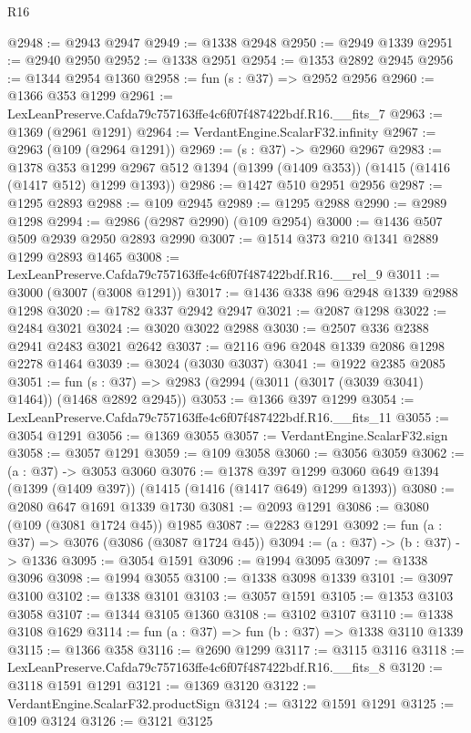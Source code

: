 \begin{lexlean}{R16}
\begin{coremodule}
@2948 := @2943 @2947
@2949 := @1338 @2948
@2950 := @2949 @1339
@2951 := @2940 @2950
@2952 := @1338 @2951
@2954 := @1353 @2892 @2945
@2956 := @1344 @2954 @1360
@2958 := fun (s : @37) => @2952 @2956
@2960 := @1366 @353 @1299
@2961 := LexLeanPreserve.Cafda79c757163ffe4c6f07f487422bdf.R16.__fits_7
@2963 := @1369 (@2961 @1291)
@2964 := VerdantEngine.ScalarF32.infinity
@2967 := @2963 (@109 (@2964 @1291))
@2969 := (s : @37) -> @2960 @2967
@2983 := @1378
    @353
    @1299
    @2967
    @512
    @1394
    (@1399 (@1409 @353))
    (@1415 (@1416 (@1417 @512) @1299 @1393))
@2986 := @1427 @510 @2951 @2956
@2987 := @1295 @2893
@2988 := @109 @2945
@2989 := @1295 @2988
@2990 := @2989 @1298
@2994 := @2986 (@2987 @2990) (@109 @2954)
@3000 := @1436 @507 @509 @2939 @2950 @2893 @2990
@3007 := @1514 @373 @210 @1341 @2889 @1299 @2893 @1465
@3008 := LexLeanPreserve.Cafda79c757163ffe4c6f07f487422bdf.R16.__rel_9
@3011 := @3000 (@3007 (@3008 @1291))
@3017 := @1436 @338 @96 @2948 @1339 @2988 @1298
@3020 := @1782 @337 @2942 @2947
@3021 := @2087 @1298
@3022 := @2484 @3021
@3024 := @3020 @3022 @2988
@3030 := @2507 @336 @2388 @2941 @2483 @3021 @2642
@3037 := @2116 @96 @2048 @1339 @2086 @1298 @2278 @1464
@3039 := @3024 (@3030 @3037)
@3041 := @1922 @2385 @2085
@3051 := fun (s : @37) => @2983 (@2994 (@3011 (@3017 (@3039 @3041) @1464)) (@1468 @2892 @2945))
@3053 := @1366 @397 @1299
@3054 := LexLeanPreserve.Cafda79c757163ffe4c6f07f487422bdf.R16.__fits_11
@3055 := @3054 @1291
@3056 := @1369 @3055
@3057 := VerdantEngine.ScalarF32.sign
@3058 := @3057 @1291
@3059 := @109 @3058
@3060 := @3056 @3059
@3062 := (a : @37) -> @3053 @3060
@3076 := @1378
    @397
    @1299
    @3060
    @649
    @1394
    (@1399 (@1409 @397))
    (@1415 (@1416 (@1417 @649) @1299 @1393))
@3080 := @2080 @647 @1691 @1339 @1730
@3081 := @2093 @1291
@3086 := @3080 (@109 (@3081 @1724 @45)) @1985
@3087 := @2283 @1291
@3092 := fun (a : @37) => @3076 (@3086 (@3087 @1724 @45))
@3094 := (a : @37) -> (b : @37) -> @1336
@3095 := @3054 @1591
@3096 := @1994 @3095
@3097 := @1338 @3096
@3098 := @1994 @3055
@3100 := @1338 @3098 @1339
@3101 := @3097 @3100
@3102 := @1338 @3101
@3103 := @3057 @1591
@3105 := @1353 @3103 @3058
@3107 := @1344 @3105 @1360
@3108 := @3102 @3107
@3110 := @1338 @3108 @1629
@3114 := fun (a : @37) => fun (b : @37) => @1338 @3110 @1339
@3115 := @1366 @358
@3116 := @2690 @1299
@3117 := @3115 @3116
@3118 := LexLeanPreserve.Cafda79c757163ffe4c6f07f487422bdf.R16.__fits_8
@3120 := @3118 @1591 @1291
@3121 := @1369 @3120
@3122 := VerdantEngine.ScalarF32.productSign
@3124 := @3122 @1591 @1291
@3125 := @109 @3124
@3126 := @3121 @3125

\end{coremodule}
\end{lexlean}
